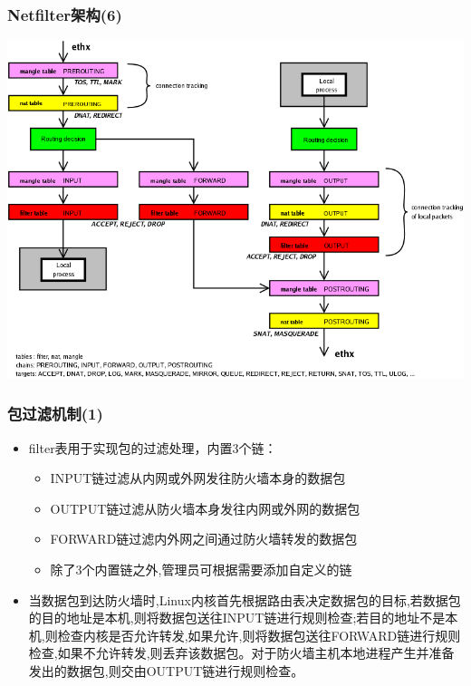 \documentclass[xcolor=svgnames,presentation]{beamer}
\begin{document}
\begin{frame}
\frametitle{Netfilter架构(6)}
\label{sec-2-6}
\label{sec-2-6-1}

\includegraphics[width=.9\linewidth]{img/iptables.png}
\end{frame}
\begin{frame}
\frametitle{包过滤机制(1)}
\label{sec-2-7}
\begin{itemize}

\item filter表用于实现包的过滤处理，内置3个链：
\label{sec-2-7-1}%
\begin{itemize}

\item INPUT链过滤从内网或外网发往防火墙本身的数据包
\label{sec-2-7-1-1}%

\item OUTPUT链过滤从防火墙本身发往内网或外网的数据包
\label{sec-2-7-1-2}%

\item FORWARD链过滤内外网之间通过防火墙转发的数据包
\label{sec-2-7-1-3}%

\item 除了3个内置链之外,管理员可根据需要添加自定义的链
\label{sec-2-7-1-4}%
\end{itemize} %

\item 当数据包到达防火墙时,Linux内核首先根据路由表决定数据包的目标,若数据包的目的地址是本机,则将数据包送往INPUT链进行规则检查;若目的地址不是本机,则检查内核是否允许转发,如果允许,则将数据包送往FORWARD链进行规则检查,如果不允许转发,则丢弃该数据包。对于防火墙主机本地进程产生并准备发出的数据包,则交由OUTPUT链进行规则检查。
\label{sec-2-7-2}%
\end{itemize} %
\end{frame}
\end{document}
